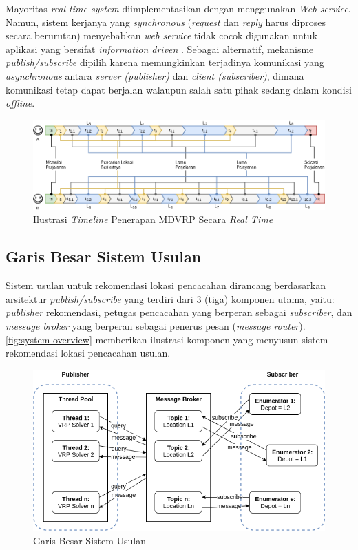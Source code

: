Mayoritas \textit{real time system} diimplementasikan dengan menggunakan \textit{Web service}. Namun, sistem kerjanya yang \textit{synchronous} (\textit{request} dan \textit{reply} harus diproses secara berurutan) menyebabkan \textit{web service} tidak cocok digunakan untuk aplikasi yang bersifat \textit{information driven} \citep{muhl_large-scale_2002}. Sebagai alternatif, mekanisme \textit{publish/subscribe} dipilih karena memungkinkan terjadinya komunikasi yang \textit{asynchronous} antara \textit{server (publisher)} dan \textit{client (subscriber)}, dimana komunikasi tetap dapat berjalan walaupun salah satu pihak sedang dalam kondisi \textit{offline}.


\begin{figure}[!]
	\centering
	\includegraphics[width=\textwidth]{Resources/Images/illustration-timeline-realtime-mdvrp}
	\caption{Ilustrasi \textit{Timeline} Penerapan MDVRP Secara \textit{Real Time}}
	\label{fig:illustration-timeline-realtime-mdvrp}
\end{figure}

\subsection{Garis Besar Sistem Usulan}
Sistem usulan untuk rekomendasi lokasi pencacahan dirancang berdasarkan arsitektur \textit{publish/subscribe} yang terdiri dari 3 (tiga) komponen utama, yaitu: \textit{publisher} rekomendasi, petugas pencacahan yang berperan sebagai \textit{subscriber}, dan \textit{message broker} yang berperan sebagai penerus pesan (\textit{message router}). \autoref{fig:system-overview} memberikan ilustrasi komponen yang menyusun sistem rekomendasi lokasi pencacahan usulan.


\begin{figure}[!]
	\centering
	\includegraphics[width=\textwidth]{Resources/Images/system-overview}
	\caption{Garis Besar Sistem Usulan}
	\label{fig:system-overview}
\end{figure}


